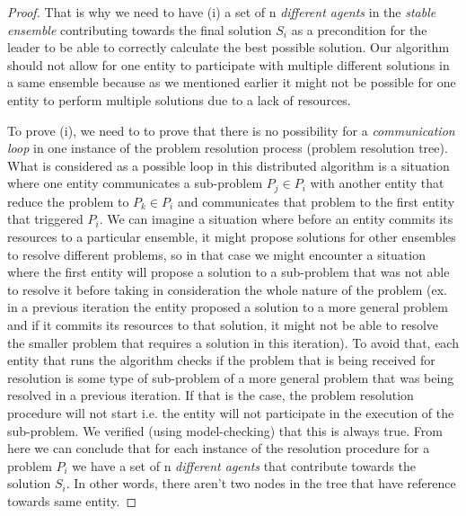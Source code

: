 \documentclass[journal]{IEEEtran}
\theoremstyle{definition}
\begin{document}
\begin{proof}
That is why we need to have (i) a set of n \textit{different agents} in the \textit{stable ensemble} contributing towards the final solution $S_i$  as a precondition for the leader to be able to correctly calculate the best possible solution. Our algorithm should not 
allow for one entity to participate with multiple different solutions in a same ensemble because as we mentioned earlier it might not be possible for one entity to perform multiple solutions due to a lack of resources.


To prove (i), we need to to prove that there is no possibility for a \textit{communication loop} in one instance of the problem resolution process (problem resolution tree).
What is considered as a possible loop in this distributed algorithm is a situation where one entity communicates a  sub-problem $P_j \in P_i$ with another entity that reduce the problem to $P_k \in P_i$ and communicates that problem to the first entity that triggered $P_i$. We can imagine a situation where before an entity commits its resources to a particular ensemble, it might propose solutions for other ensembles to resolve different problems, so in that case we might encounter a situation where the first entity will propose a solution to a sub-problem that was not able to resolve it before taking in consideration the whole nature of the problem (ex. in a previous iteration the entity proposed a solution to a more general problem and if it commits its resources to that solution, it might not be able to resolve the smaller problem that requires a solution in this iteration). To avoid that, each entity that runs the algorithm checks if the problem that is being received for resolution is some type of sub-problem of a more general problem that was being resolved in a previous iteration. If that is the case, the problem resolution procedure will not start i.e. the entity will not participate in the execution of the sub-problem.
We verified (using model-checking) that this is always true. From here we can conclude that for each instance of the resolution procedure for a problem $P_i$ we have a set of n \textit{different agents} that contribute towards the solution $S_i$. In other words, there aren't two nodes in the tree that have reference towards same entity.









\end{proof}
\end{document}
